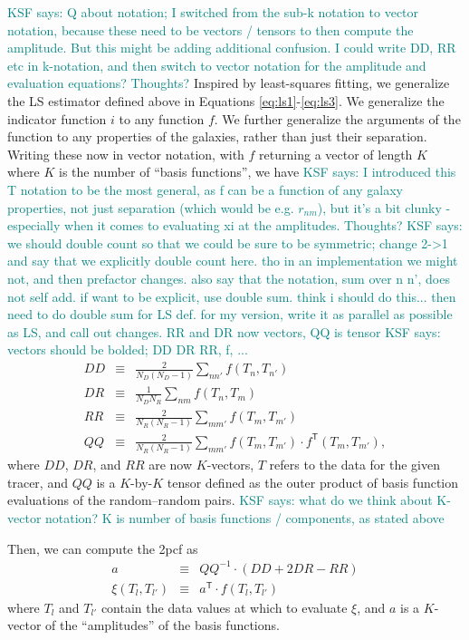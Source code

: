 \documentclass[modern]{aastex62}
\newcommand{\cf}{2pcf\xspace} %
\newcommand{\LS}{LS\xspace}
\newcommand{\inv}{^{-1}}
\newcommand{\T}{^{\mathsf{T}}}
\newcommand{\KSF}[1]{\textcolor{teal}{KSF says: #1}}
\begin{document}
\KSF{Q about notation; I switched from the sub-k notation to vector notation, because these need to be vectors / tensors to then compute the amplitude. But this might be adding additional confusion. I could write DD, RR etc in k-notation, and then switch to vector notation for the amplitude and evaluation equations? Thoughts?}
Inspired by least-squares fitting, we generalize the \LS estimator defined above in Equations \ref{eq:ls1}-\ref{eq:ls3}.
We generalize the indicator function $i$ to any function $f$.
We further generalize the arguments of the function to any properties of the galaxies, rather than just their separation. 
Writing these now in vector notation, with $f$ returning a vector of length $K$ where $K$ is the number of ``basis functions'', we have
\KSF{I introduced this T notation to be the most general, as f can be a function of any galaxy properties, not just separation (which would be e.g. $r_{nm}$), but it's a bit clunky - especially when it comes to evaluating xi at the amplitudes. Thoughts?}
\KSF{we should double count so that we could be sure to be symmetric; change 2->1 and say that we explicitly double count here. tho in an implementation we might not, and then prefactor changes. also say that the notation, sum over n n', does not self add. if want to be explicit, use double sum. think i should do this... then need to do double sum for LS def. for my version, write it as parallel as possible as LS, and call out changes. RR and DR now vectors, QQ is tensor}
\KSF{vectors should be bolded; DD DR RR, f, ...}
\begin{eqnarray}\displaystyle
DD &\equiv& \frac{2}{N_D(N_D-1)} \sum_{n n'} f(T_n, T_{n'}) \\
DR &\equiv& \frac{1}{N_D N_R} \sum_{n m} f(T_n, T_{m}) \\
RR &\equiv& \frac{2}{N_R(N_R-1)} \sum_{m m'} f(T_m, T_{m'}) \\
QQ &\equiv& \frac{2}{N_R(N_R-1)} \sum_{m m'} f(T_m, T_{m'}) \cdot f\T(T_m, T_{m'}), \label{eq:qq_proj}
\end{eqnarray}
where $DD$, $DR$, and $RR$ are now $K$-vectors, $T$ refers to the data for the given tracer, and $QQ$ is a $K$-by-$K$ tensor defined as the outer product of basis function evaluations of the random--random pairs.
\KSF{what do we think about K-vector notation? K is number of basis functions / components, as stated above}

Then, we can compute the \cf as
\begin{eqnarray}\displaystyle
a &\equiv& QQ\inv \cdot (DD + 2DR - RR) \\
\xi(T_l, T_{l'}) &\equiv& a\T \cdot f(T_l, T_{l'}) \label{eq:xi_proj}
\end{eqnarray}
where $T_l$ and $T_{l'}$ contain the data values at which to evaluate $\xi$, and $a$ is a $K$-vector of the ``amplitudes'' of the basis functions.
\end{document}
